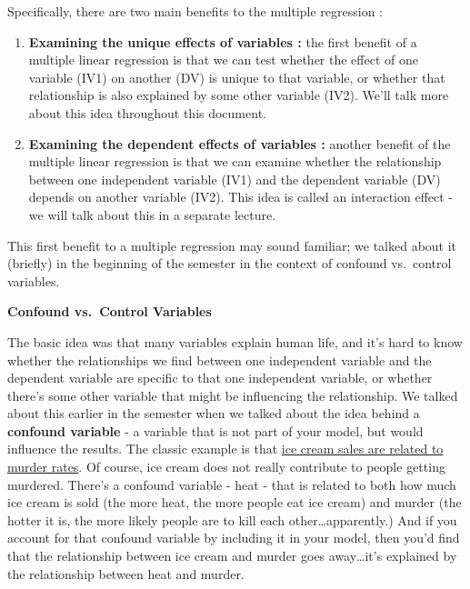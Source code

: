 \documentclass[
  letterpaper,
  DIV=11,
  numbers=noendperiod,
  oneside]{scrreprt}
\begin{document}
Specifically, there are two main benefits to the multiple regression :~

\begin{enumerate}
\def\labelenumi{\arabic{enumi}.}
\item
  \textbf{Examining the unique effects of variables :} the first benefit
  of a multiple linear regression is that we can test whether the effect
  of one variable (IV1) on another (DV) is unique to that variable, or
  whether that relationship is also explained by some other variable
  (IV2). We'll talk more about this idea throughout this document.
\item
  \textbf{Examining the dependent effects of variables :} another
  benefit of the multiple linear regression is that we can examine
  whether the relationship between one independent variable (IV1) and
  the dependent variable (DV) depends on another variable (IV2). This
  idea is called an interaction effect - we will talk about this in a
  separate lecture.
\end{enumerate}

This first benefit to a multiple regression may sound familiar; we
talked about it (briefly) in the beginning of the semester in the
context of confound vs.~control variables.

\textbf{Confound vs.~Control Variables}

The basic idea was that many variables explain human life, and it's hard
to know whether the relationships we find between one independent
variable and the dependent variable are specific to that one independent
variable, or whether there's some other variable that might be
influencing the relationship. We talked about this earlier in the
semester when we talked about the idea behind a \textbf{confound
variable} - a variable that is not part of your model, but would
influence the results. The classic example is that
\href{http://www.slate.com/blogs/crime/2013/07/09/warm_weather_homicide_rates_when_ice_cream_sales_rise_homicides_rise_coincidence.html}{ice
cream sales are related to murder rates}. Of course, ice cream does not
really contribute to people getting murdered. There's a confound
variable - heat - that is related to both how much ice cream is sold
(the more heat, the more people eat ice cream) and murder (the hotter it
is, the more likely people are to kill each other\ldots apparently.) And
if you account for that confound variable by including it in your model,
then you'd find that the relationship between ice cream and murder goes
away\ldots it's explained by the relationship between heat and murder.
\end{document}
